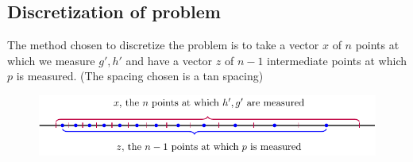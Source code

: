 \documentclass{article}
\begin{document}
\subsection*{Discretization of problem}
The method chosen to discretize the problem is to take a vector $x$ of $n$ 
points at which we measure $g', h'$ and have a vector $z$ of $n-1$ intermediate 
points at which $p$ is measured. (The spacing chosen is a tan spacing)
\begin{figure}[!ht]\centering
\includegraphics{NumFig2.pdf}
\end{figure}
\end{document}
